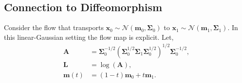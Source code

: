 \subsection{Connection to Diffeomorphism}

Consider the flow that transports $\mathbf x_0 \sim \mathcal{N}(\boldsymbol m_0, \boldsymbol \Sigma_0)$ to $\mathbf x_1 \sim \mathcal{N}(\boldsymbol m_1, \boldsymbol \Sigma_1)$. In this linear-Gaussian setting the flow map is explicit. Let,
\vspace{-0.5em}
\begin{align*}
\mathbf A & = \boldsymbol \Sigma_0^{-1/2}\left(\boldsymbol\Sigma_0^{1/2}\boldsymbol \Sigma_1 \boldsymbol \Sigma_0^{1/2}\right)^{1/2} \boldsymbol \Sigma_0^{-1/2}, \\
\mathbf L & = \log(\mathbf A), \\
\boldsymbol m(t) & = (1-t)\boldsymbol m_0 + t \boldsymbol m_1.
\end{align*}


